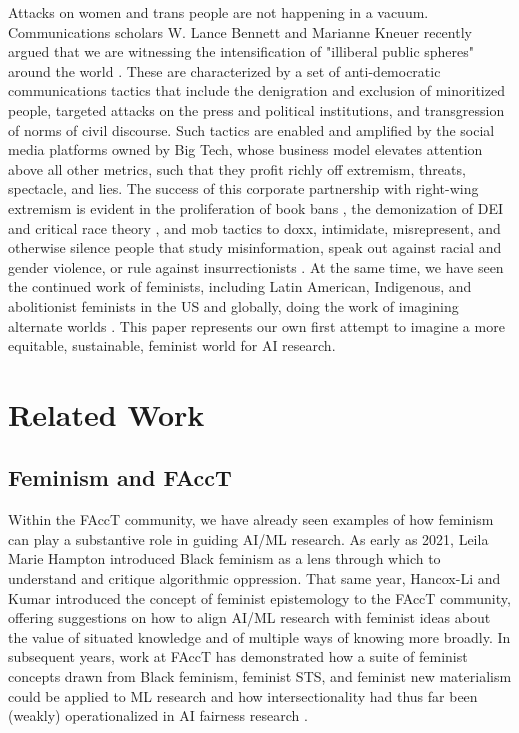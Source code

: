 Attacks on women and trans people are not happening in a vacuum. Communications scholars W. Lance Bennett and Marianne Kneuer recently argued that we are witnessing the intensification of "illiberal public spheres" around the world \cite{Bennett_Kneuer_2023}. These are characterized by a set of anti-democratic communications tactics that include the denigration and exclusion of minoritized people, targeted attacks on the press and political institutions, and transgression of norms of civil discourse. Such tactics are enabled and amplified by the social media platforms owned by Big Tech, whose business model elevates attention above all other metrics, such that they profit richly off extremism, threats, spectacle, and lies. The success of this corporate partnership with right-wing extremism is evident in the proliferation of book bans \cite{Magnusson}, the demonization of DEI and critical race theory \cite{Crenshaw_2022}, and mob tactics to doxx, intimidate, misrepresent, and otherwise silence people that study misinformation, speak out against racial and gender violence, or rule against insurrectionists \cite{Edmonds_2024}. 
At the same time, we have seen the continued work of feminists, including Latin American, Indigenous, and abolitionist feminists in the US and globally, doing the work of imagining alternate worlds \cite{Imagining_Abolition_2021, Davis_2022, Ricaurte2019, Simpson_2017}. 
This paper represents our own first attempt to imagine a more equitable, sustainable, feminist world for AI research.


\section{Related Work}

\subsection{Feminism and FAccT}

Within the FAccT community, we have already seen examples of how feminism can play a substantive role in guiding AI/ML research. As early as 2021, Leila Marie Hampton \cite{Hampton_2021} introduced Black feminism as a lens through which to understand and critique algorithmic oppression. That same year, Hancox-Li and Kumar \cite{Hancox-Li_Kumar_2021} introduced the concept of feminist epistemology to the FAccT community, offering suggestions on how to align AI/ML research with feminist ideas about the value of situated knowledge \cite{Haraway_1988} and of multiple ways of knowing more broadly. In subsequent years, work at FAccT has demonstrated how a suite of feminist concepts drawn from Black feminism, feminist STS, and feminist new materialism could be applied to ML research \cite{Klumbytė_Draude_Taylor_2022} and how intersectionality had thus far been (weakly) operationalized in AI fairness research \cite{Kong_2022}. 

